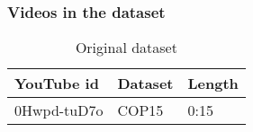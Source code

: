 \subsubsection{Videos in the dataset}
%
\begin{table}[ht]
	\begin{center}
	\caption{Original dataset}
	\label{tab:}
		\begin{tabular}{lll}
		\toprule
			YouTube id & Dataset & Length \\
			\midrule
			0Hwpd-tuD7o & COP15 & 0:15\\
		\bottomrule
		\end{tabular}
	\end{center}
\end{table}
%
